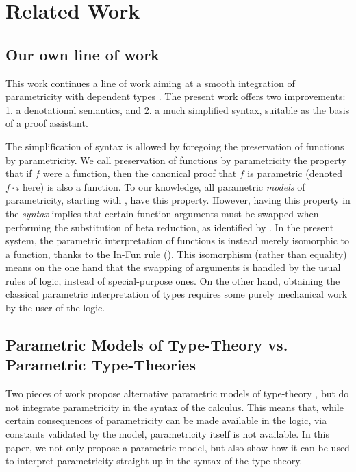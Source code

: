 \documentclass[english]{PaperTools/latex/lipics}
\newcommand\param[1]{\!\cdot\!#1}
\begin{document}
\section{Related Work}

\subsection{Our own line of work}
This work continues a line of work aiming at a smooth integration of
parametricity with dependent types
\citep{bernardy_parametricity_2010,bernardy_realizability_2011,bernardy_proofs_2012,bernardy_computational_2012,bernardy_type-theory_2013}. The present work offers two improvements:
1. a denotational semantics, and
2. a much simplified syntax, suitable as the basis of a proof assistant.

The simplification of syntax is allowed by foregoing the preservation
of functions by parametricity. We call preservation of functions by
parametricity the property that if $f$ were a function, then the
canonical proof that $f$ is parametric (denoted $f \param i$ here) is
also a function. To our knowledge, all parametric \emph{models} of parametricity,
starting with \citet{reynolds_types_1983}, have this property.
However, having this property in the \emph{syntax} implies that
certain function arguments must be swapped when performing the
substitution of beta reduction, as identified by
\citet{bernardy_computational_2012}.  In the present system, the
parametric interpretation of functions is instead merely isomorphic to
a function, thanks to the {\sc In-Fun} rule (). This
isomorphism (rather than equality) means on the one hand that the
swapping of arguments is handled by the usual rules of logic, instead
of special-purpose ones. On the other hand, obtaining the classical
parametric interpretation of types requires some purely mechanical
work by the user of the logic.

\subsection{Parametric Models of Type-Theory vs. Parametric Type-Theories}

Two pieces of work propose alternative parametric models of
type-theory
\citep{atkey_relationally_2014,krishnaswami_internalizing_2013}, but
do not integrate parametricity in the syntax of the calculus. This
means that, while certain consequences of parametricity can be made
available in the logic, via constants validated by the model,
parametricity itself is not available. In this paper, we not only
propose a parametric model, but also show how it can be used to
interpret parametricity straight up in the syntax of the type-theory.
\end{document}
